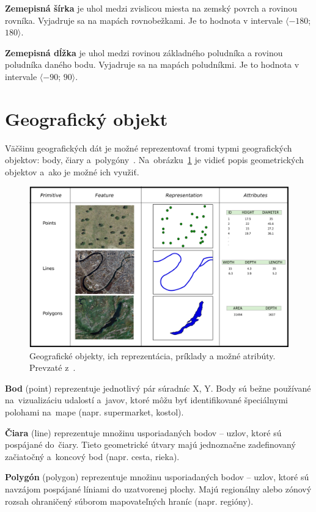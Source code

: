 \textbf{Zemepisná šírka} je uhol medzi zvislicou miesta na zemský povrch a rovinou rovníka. Vyjadruje sa na mapách rovnobežkami. Je to hodnota v intervale $\langle-180$; $180\rangle$.

\textbf{Zemepisná dĺžka} je uhol medzi rovinou základného poludníka a rovinou poludníka daného bodu. Vyjadruje sa na mapách poludníkmi. Je to hodnota v intervale $\langle-90$; $90\rangle$.


\section{Geografický objekt}
Väčšinu geografických dát je možné reprezentovať tromi typmi geografických objektov: body, čiary a~polygóny~\cite{geographicobjects}. Na~obrázku~\ref{fig:geo-objects} je vidieť popis geometrických objektov a~ako je možné ich využiť.

\begin{figure}[ht]
    \centering
    \includegraphics[width=0.8\linewidth]{obrazky-figures/geo-objects.png}
    \caption{Geografické objekty, ich reprezentácia, príklady a možné atribúty. Prevzaté z~\cite{introductiontogis}.}
    \label{fig:geo-objects}
\end{figure}

\textbf{Bod} (point) reprezentuje jednotlivý pár súradníc X, Y. Body sú bežne používané na~vizualizáciu udalostí a~javov, ktoré môžu byť identifikované špeciálnymi polohami na~mape (napr. supermarket, kostol).

\textbf{Čiara} (line) reprezentuje množinu usporiadaných bodov \--- uzlov, ktoré sú pospájané do~čiary. Tieto geometrické útvary majú jednoznačne zadefinovaný začiatočný a~koncový bod (napr. cesta, rieka).

\textbf{Polygón} (polygon) reprezentuje množinu usporiadaných bodov \--- uzlov, ktoré sú navzájom pospájané líniami do uzatvorenej plochy. Majú regionálny alebo zónový rozsah ohraničený súborom mapovateľných hraníc (napr. regióny).\\

